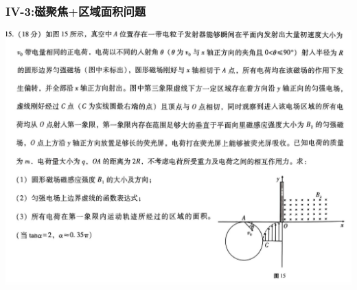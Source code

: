 \documentclass{article}
\begin{document}
\subsubsection{IV-3:磁聚焦+区域面积问题}
\includegraphics[width=50em,keepaspectratio]{./pictures/3.1-6.png}
\end{document}
